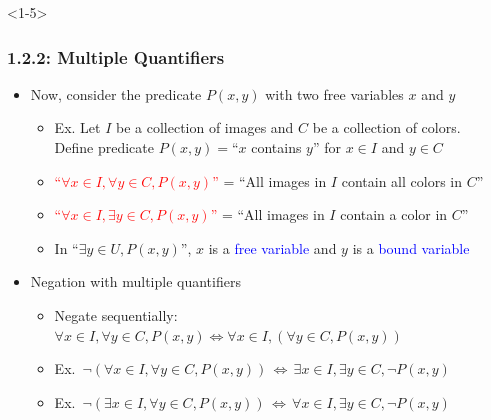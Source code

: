 \documentclass[10pt,english,aspectratio=169]{beamer}
\begin{document}
\begin{frame}<1-5> \frametitle{1.2.2: Multiple Quantifiers}



\begin{itemize}
\setlength\itemsep{6mm}
\item<1-> Now, consider the predicate $P(x,y)$ with two free variables $x$ and $y$ \vspace{1mm}
\begin{itemize}
 \setlength\itemsep{1.5mm}
 \item Ex. Let $I$ be a collection of images and $C$ be a collection of colors. \\ Define predicate $P(x,y)=$``$x$ contains $y$'' for $x\in I$ and $y\in C$ 
 \item<2-> \textcolor{red}{``$\forall x\!\in\! I, \forall y\!\in\! C, P(x,y)$''} = ``All images in $I$ contain all colors in $C$''
 \item<3-> \textcolor{red}{``$\forall x\!\in\! I, \exists y \!\in\! C, P(x,y)$''} = ``All images in $I$ contain a color in $C$''
 \item<4-> In ``$\exists y \in U, P(x,y)$'', $x$ is a \textcolor{blue}{free variable} and $y$ is a \textcolor{blue}{bound variable}
\end{itemize}

\item<5-> Negation with multiple quantifiers \vspace{1mm}
\begin{itemize}
 \setlength\itemsep{1.5mm}
 \item Negate sequentially: $\forall x\!\in\! I, \forall y\!\in\! C, P(x,y) \Leftrightarrow \forall x\!\in\! I, \left(\forall y\!\in\! C, P(x,y)\right)$
 \item Ex.\ $\neg (\forall x\!\in\! I, \forall y\!\in\! C, P(x,y)) \,\Leftrightarrow\, \exists x\!\in\! I, \exists y\!\in\! C, \neg P(x,y)$
 \item Ex.\ $\neg (\exists x\!\in\! I, \forall y\!\in\! C, P(x,y)) \,\Leftrightarrow\, \forall x\!\in\! I, \exists y\!\in\! C, \neg P(x,y)$
\end{itemize}  

\end{itemize}



\end{frame}
\end{document}
